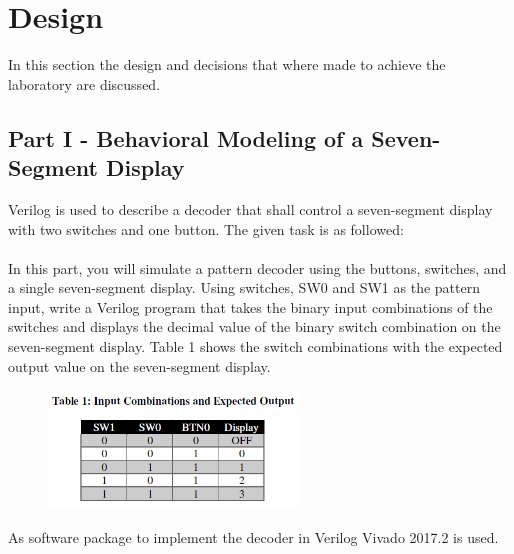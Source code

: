 \section{Design}\label{sec: Design}
In this section the design and decisions that where made to achieve the laboratory are discussed.

\subsection{Part I - Behavioral Modeling of a Seven-Segment Display}\label{subsec: Behavioral Modeling of a Seven-Segment Display}
Verilog is used to describe a decoder that shall control a seven-segment display with two switches and one button. The given task is as followed:
\\
\\
In this part, you will simulate a pattern decoder using the buttons, switches, and a single seven-segment display.
Using switches, SW0 and SW1 as the pattern input, write a Verilog program that takes the binary input
combinations of the switches and displays the decimal value of the binary switch combination on the seven-segment
display. Table 1 shows the switch combinations with the expected output value on the seven-segment
display.

\begin{figure}[htbp]
	\centering
	\includegraphics[width=0.6\textwidth]{01_images/Vivado_lab2_part1_table1.png}
	\label{fig: Vivado_lab2_part1_table1}
\end{figure}

As software package to implement the decoder in Verilog Vivado 2017.2 is used. 

